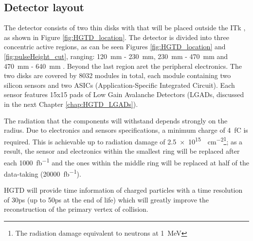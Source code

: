 \subsection{Detector layout}\label{subsec:HGTD_layout}

The detector consists of two thin disks with that will be placed outside the ITk , as shown in Figure \ref{fig:HGTD_location}. The detector is divided into three concentric active regions, as can be seen Figures \ref{fig:HGTD_location} and \ref{fig:pulseHeight_cut}, ranging: \qty{120}{\milli\meter} - \qty{230}{\milli\meter}, \qty{230}{\milli\meter} - \qty{470}{\milli\meter} and  \qty{470}{\milli\meter} - \qty{640}{\milli\meter} \cite{CERN-LHCC-2020-007}. Beyond the last region aret the peripheral electronics. The two disks are covered by 8032 modules in total, each module containing two silicon sensors and two ASICs (Application-Specific Integrated Circuit). Each sensor features 15x15 pads of Low Gain Avalanche Detectors (LGADs, discussed in the next Chapter \ref{chap:HGTD_LGADs}).

The radiation that the components will withstand depends strongly on the radius. Due to electronics and sensors specifications, a minimum charge of \qty{4}{\femto\coulomb} is required. This is achievable up to radiation damage of \qty{2.5e15}{\neutroneq\centi\meter^{-2}}\footnote{The radiation damage equivalent to neutrons at \qty{1}{\mega\electronvolt} }; as a result, the sensor and electronics within the smallest ring will be replaced after each \qty{1000}{\femto\barn^{-1}} and the ones within the middle ring will be replaced at half of the data-taking (\qty{20000}{\femto\barn^{-1}}). 


HGTD will provide time information of charged particles with a time resolution of 30ps (up to 50ps at the end of life) which will greatly improve the reconstruction of the primary vertex of collision. 



